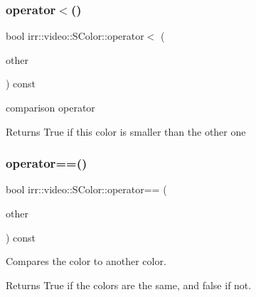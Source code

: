 \subsubsection{\texorpdfstring{operator$<$()}{operator<()}}
{\footnotesize\ttfamily bool irr\+::video\+::\+S\+Color\+::operator$<$ (\begin{DoxyParamCaption}\item[{const \hyperlink{classirr_1_1video_1_1SColor}{S\+Color} \&}]{other }\end{DoxyParamCaption}) const\hspace{0.3cm}{\ttfamily [inline]}}



comparison operator 

\begin{DoxyReturn}{Returns}
True if this color is smaller than the other one 
\end{DoxyReturn}
\mbox{\label{classirr_1_1video_1_1SColor_a7042c0433d4b89e6473e9f123f6b35d0}} 
\subsubsection{\texorpdfstring{operator==()}{operator==()}}
{\footnotesize\ttfamily bool irr\+::video\+::\+S\+Color\+::operator== (\begin{DoxyParamCaption}\item[{const \hyperlink{classirr_1_1video_1_1SColor}{S\+Color} \&}]{other }\end{DoxyParamCaption}) const\hspace{0.3cm}{\ttfamily [inline]}}



Compares the color to another color. 

\begin{DoxyReturn}{Returns}
True if the colors are the same, and false if not. 
\end{DoxyReturn}
\mbox{\label{classirr_1_1video_1_1SColor_a8cf295c05c7406cc249843acbb31ec5f}} 

